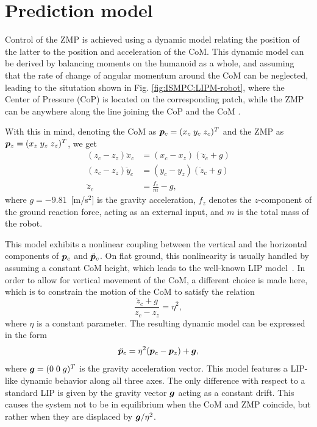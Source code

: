 \section{Prediction model}

Control of the ZMP is achieved using a dynamic model relating the position of the latter to the position and acceleration of the CoM. This dynamic model can be derived by balancing moments on the humanoid as a whole, and assuming that the rate of change of angular momentum around the CoM can be neglected, leading to the situtation shown in Fig. \ref{fig:ISMPC:LIPM-robot}, where the Center of Pressure (CoP) is located on the corresponding patch, while the ZMP can be anywhere along the line joining the CoP and the CoM \cite{CaKh:17}.

With this in mind, denoting the CoM as ${\bm{p}}_c = (x_c \; y_c \; z_c)^T$ and the ZMP as ${\bm{p}}_z = (x_z \; y_z \; z_z)^T$, we get
\begin{equation}\begin{split}
(z_c - z_z)\ddot x_c &= (x_c - x_z)(\ddot z_c + g) \\
(z_c - z_z)\ddot y_c &= (y_c - y_z)(\ddot z_c + g) \\
\ddot{z}_c &= \frac{f_z}{m}-g,
\end{split}\end{equation}
where $g=-9.81$~[m/s$^2$] is the gravity acceleration, $f_z$ denotes the $z$-component of the ground reaction force, acting as an external input, and $m$ is the total mass of the robot.

This model exhibits a nonlinear coupling between the vertical and the horizontal components of ${\bm{p}}_c$ and $\ddot{{\bm{p}}}_c$. On flat ground, this nonlinearity is usually handled by assuming a constant CoM height, which leads to the well-known LIP model~\cite{KaKaKaFuHaYoHi:03}. In order to allow for vertical movement of the CoM, a different choice is made here, which is to constrain the motion of the CoM \cite{ZaScLaOr:18} to satisfy the relation
\begin{equation*}
    \frac{\ddot z_c + g}{z_c - z_z} = \eta^2,
\end{equation*}
where $\eta$ is a constant parameter.
The resulting dynamic model can be expressed in the form
\begin{equation}\label{eq:WoS:3dmodel}
\ddot {{\bm{p}}}_c = \eta^2({\bm{p}}_c - {\bm{p}}_z) + {\bm{g}},
\end{equation}
where ${\bm{g}} = (0 \; 0 \; {g})^T$ is the gravity acceleration vector. This model features a LIP-like dynamic behavior along all three axes. The only difference with respect to a standard LIP is given by the gravity vector ${\bm{g}}$ acting as a constant drift. This causes the system not to be in equilibrium when the CoM and ZMP coincide, but rather when they are displaced by ${\bm{g}}/\eta^2$.

